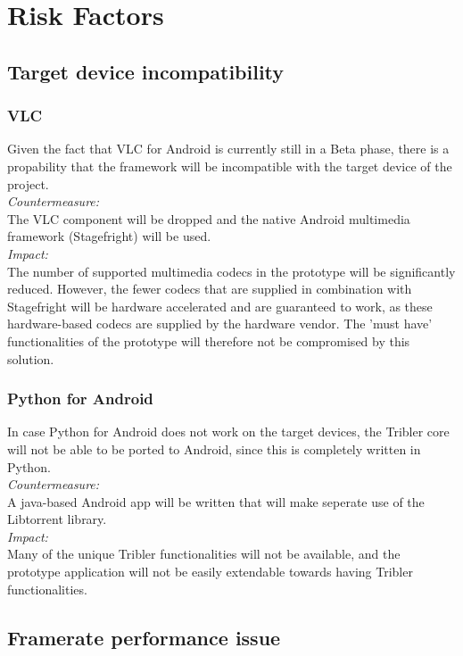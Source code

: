 \section{Risk Factors}
\subsection{Target device incompatibility}
\subsubsection{VLC}
Given the fact that VLC for Android is currently still in a Beta phase, there is a propability that the framework will be incompatible with the target device of the project.\\
\newline
\textit{Countermeasure:}\\
The VLC component will be dropped and the native Android multimedia framework (Stagefright) will be used.\\
\newline
\textit{Impact:}\\
The number of supported multimedia codecs in the prototype will be significantly reduced. However, the fewer codecs that are supplied in combination with Stagefright will be hardware accelerated and are guaranteed to work, as these hardware-based codecs are supplied by the hardware vendor. The 'must have' functionalities of the prototype will therefore not be compromised by this solution. 
\subsubsection{Python for Android}
In case Python for Android does not work on the target devices, the Tribler core will not be able to be ported to Android, since this is completely written in Python.\\
\newline
\textit{Countermeasure:}\\
A java-based Android app will be written that will make seperate use of the Libtorrent library.\\
\newline
\textit{Impact:}\\
Many of the unique Tribler functionalities will not be available, and the prototype application will not be easily extendable towards having Tribler functionalities.
\subsection{Framerate performance issue}
